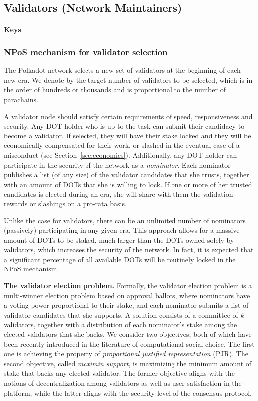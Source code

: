 \subsection{Validators (Network Maintainers)}\label{sec:validators}
 \paragraph{Keys}

 \subsubsection{NPoS mechanism for validator selection}

 The Polkadot network selects a new set of validators at the beginning of each new era. We denote by \nval the target number of validators to be selected, which is in the order of hundreds or thousands and is proportional to the number of parachains.


A validator node should satisfy certain requirements of speed, responsiveness and security. Any DOT holder who is up to the task can submit their candidacy to become a validator. If selected, they will have their stake locked and they will be economically compensated for their work, or slashed in the eventual case of a misconduct (see Section~\ref{sec:economics}). Additionally, any DOT holder can participate in the security of the network as a \emph{nominator}. Each nominator publishes a list (of any size) of the validator candidates that she trusts, together with an amount of DOTs that she is willing to lock. If one or more of her trusted candidates is elected during an era, she will share with them the validation rewards or slashings on a pro-rata basis. 

Unlike the case for validators, there can be an unlimited number of nominators (passively) participating in any given era. This approach allows for a massive amount of DOTs to be staked, much larger than the DOTs owned solely by validators, which increases the security of the network. In fact, it is expected that a significant percentage of all available DOTs will be routinely locked in the NPoS mechanism.

\textbf{The validator election problem.} Formally, the validator election problem is a multi-winner election problem based on approval ballots, where nominators have a voting power proportional to their stake, and each nominator submits a list of validator candidates that she supports. A solution consists of a committee of $k$ validators, together with a distribution of each nominator's stake among the elected validators that she backs. We consider two objectives, both of which have been recently introduced in the literature of computational social choice. The first one is achieving the property of \emph{proportional justified representation} (PJR). The second objective, called \emph{maximin support}, is maximizing the minimum amount of stake that backs any elected validator. The former objective aligns with the notions of decentralization among validators as well as user satisfaction in the platform, while the latter aligns with the security level of the consensus protocol. 

